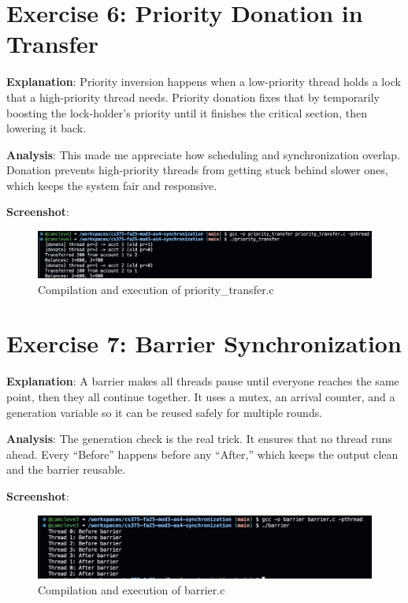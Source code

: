\documentclass{article}
\begin{document}
\section{Exercise 6: Priority Donation in Transfer}


\textbf{Explanation}:  
Priority inversion happens when a low-priority thread holds a lock that a high-priority thread needs. Priority donation fixes that by temporarily boosting the lock-holder’s priority until it finishes the critical section, then lowering it back.

\textbf{Analysis}:  
This made me appreciate how scheduling and synchronization overlap. Donation prevents high-priority threads from getting stuck behind slower ones, which keeps the system fair and responsive.

\textbf{Screenshot}:
\begin{figure}[h]
  \centering
  \includegraphics[width=\textwidth]{pic6.png}
  \caption{Compilation and execution of priority\_transfer.c}
\end{figure}

\section{Exercise 7: Barrier Synchronization}


\textbf{Explanation}:  
A barrier makes all threads pause until everyone reaches the same point, then they all continue together. It uses a mutex, an arrival counter, and a generation variable so it can be reused safely for multiple rounds.

\textbf{Analysis}:  
The generation check is the real trick. It ensures that no thread runs ahead. Every “Before” happens before any “After,” which keeps the output clean and the barrier reusable.

\textbf{Screenshot}:
\begin{figure}[h]
  \centering
  \includegraphics[width=\textwidth]{pic7.png}
  \caption{Compilation and execution of barrier.c}
\end{figure}
\end{document}
